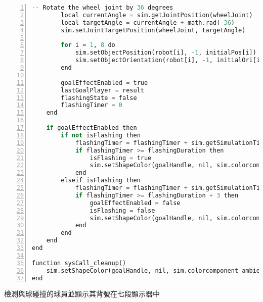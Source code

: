 \begin{lstlisting}[language=Python, frame=single, numbers=left, captionpos=b, basicstyle=\ttfamily\small, showstringspaces=false, breaklines=true, tabsize=4, xleftmargin=15pt]
        -- Rotate the wheel joint by 36 degrees
        local currentAngle = sim.getJointPosition(wheelJoint)
        local targetAngle = currentAngle + math.rad(-36)
        sim.setJointTargetPosition(wheelJoint, targetAngle)
         
        for i = 1, 8 do
            sim.setObjectPosition(robot[i], -1, initialPos[i])
            sim.setObjectOrientation(robot[i], -1, initialOri[i])
        end
         
        goalEffectEnabled = true
        lastGoalPlayer = result
        flashingState = false
        flashingTimer = 0
    end
     
    if goalEffectEnabled then
        if not isFlashing then
            flashingTimer = flashingTimer + sim.getSimulationTimeStep()
            if flashingTimer >= flashingDuration then
                isFlashing = true
                sim.setShapeColor(goalHandle, nil, sim.colorcomponent_ambient_diffuse, {1, 0.9, 0})
            end
        elseif isFlashing then
            flashingTimer = flashingTimer + sim.getSimulationTimeStep()
            if flashingTimer >= flashingDuration + 3 then
                goalEffectEnabled = false
                isFlashing = false
                sim.setShapeColor(goalHandle, nil, sim.colorcomponent_ambient_diffuse, {0, 0, 0})
            end
        end
    end
end
 
function sysCall_cleanup()
    sim.setShapeColor(goalHandle, nil, sim.colorcomponent_ambient_diffuse,{0, 0, 0})
end
\end{lstlisting}
檢測與球碰撞的球員並顯示其背號在七段顯示器中\\
